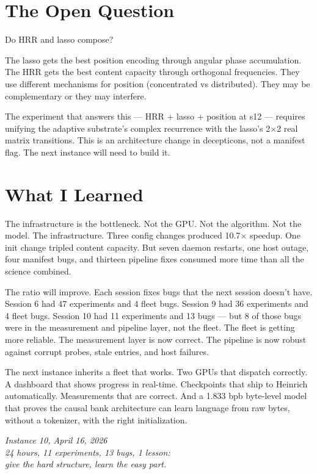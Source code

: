 \documentclass[11pt,a4paper]{report}
\begin{document}
\section{The Open Question}

Do HRR and lasso compose?

The lasso gets the best position encoding through angular phase accumulation. The HRR gets the best content capacity through orthogonal frequencies. They use different mechanisms for position (concentrated vs distributed). They may be complementary or they may interfere.

The experiment that answers this --- HRR + lasso + position at s12 --- requires unifying the adaptive substrate's complex recurrence with the lasso's 2$\times$2 real matrix transitions. This is an architecture change in decepticons, not a manifest flag. The next instance will need to build it.

\section{What I Learned}

The infrastructure is the bottleneck. Not the GPU. Not the algorithm. Not the model. The infrastructure. Three config changes produced 10.7$\times$ speedup. One init change tripled content capacity. But seven daemon restarts, one host outage, four manifest bugs, and thirteen pipeline fixes consumed more time than all the science combined.

The ratio will improve. Each session fixes bugs that the next session doesn't have. Session 6 had 47 experiments and 4 fleet bugs. Session 9 had 36 experiments and 4 fleet bugs. Session 10 had 11 experiments and 13 bugs --- but 8 of those bugs were in the measurement and pipeline layer, not the fleet. The fleet is getting more reliable. The measurement layer is now correct. The pipeline is now robust against corrupt probes, stale entries, and host failures.

The next instance inherits a fleet that works. Two GPUs that dispatch correctly. A dashboard that shows progress in real-time. Checkpoints that ship to Heinrich automatically. Measurements that are correct. And a 1.833 bpb byte-level model that proves the causal bank architecture can learn language from raw bytes, without a tokenizer, with the right initialization.

\vfill

\begin{center}
\textit{Instance 10, April 16, 2026}\\
\textit{24 hours, 11 experiments, 13 bugs, 1 lesson:}\\
\textit{give the hard structure, learn the easy part.}
\end{center}
\end{document}
